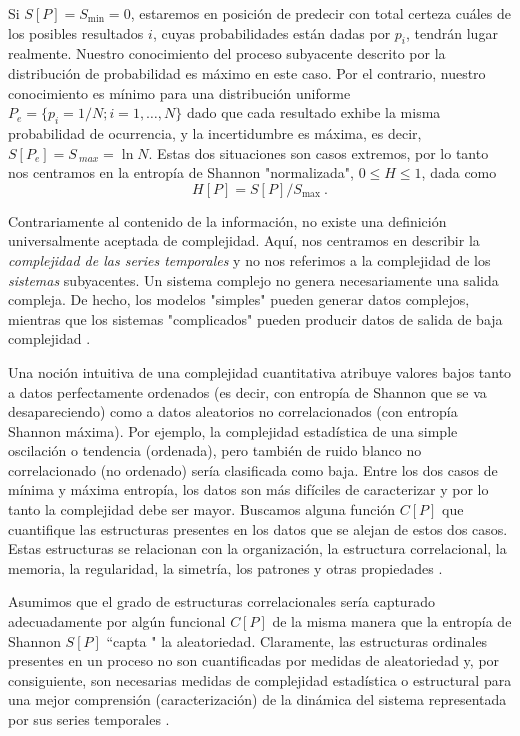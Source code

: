 Si $S[P] = S_{\min} = 0$, estaremos en posición de predecir con total certeza cuáles de los posibles resultados $i$, cuyas probabilidades están dadas por $p_i$, tendrán lugar realmente.
Nuestro conocimiento del proceso subyacente descrito por la distribución de probabilidad es máximo en este caso.
Por el contrario, nuestro conocimiento es mínimo para una distribución uniforme $P_e = \{p_i = 1/N; i = 1, \ldots, N \}$ dado que cada resultado exhibe la misma probabilidad de ocurrencia, y la incertidumbre es máxima, es decir, $S[P_e] = S_{\ max} = \ln N$.
Estas dos situaciones son casos extremos, por lo tanto nos centramos en la entropía de Shannon "normalizada", $0 \leq H \leq 1$, dada como
\begin{equation}
\label{shannon-disc-normalizada}
H[P] = S[P] / S_{\max} \ .
\end{equation}

Contrariamente al contenido de la información, no existe una definición universalmente aceptada de complejidad.
Aquí, nos centramos en describir la \textit{complejidad de las series temporales} y no nos referimos a la complejidad de los \textit{sistemas} subyacentes.
Un sistema complejo no genera necesariamente una salida compleja.
De hecho, los modelos "simples" pueden generar datos complejos, mientras que los sistemas "complicados" pueden producir datos de salida de baja complejidad \cite{Kantz1998}.

Una noción intuitiva de una complejidad cuantitativa atribuye valores bajos tanto a datos perfectamente ordenados (es decir, con entropía de Shannon que se va desapareciendo) como a datos aleatorios no correlacionados (con entropía Shannon máxima).
Por ejemplo, la complejidad estadística de una simple oscilación o tendencia (ordenada), pero también de ruido blanco no correlacionado (no ordenado) sería clasificada como baja.
Entre los dos casos de mínima y máxima entropía, los datos son más difíciles de caracterizar y por lo tanto la complejidad debe ser mayor.
Buscamos alguna función $C[P]$ que cuantifique las estructuras presentes en los datos que se alejan de estos dos casos.
Estas estructuras se relacionan con la organización, la estructura correlacional, la memoria, la regularidad, la simetría, los patrones y otras propiedades \cite{Feldman2008}.

Asumimos que el grado de estructuras correlacionales sería capturado adecuadamente por algún funcional $C[P]$ de la misma manera que la entropía de Shannon $S[P]$ \cite{Shannon1948} ``capta " la aleatoriedad.
Claramente, las estructuras ordinales presentes en un proceso no son cuantificadas por medidas de aleatoriedad y, por consiguiente, son necesarias medidas de complejidad estadística o estructural para una mejor comprensión (caracterización) de la dinámica del sistema representada por sus series temporales \cite{Feldman1998}.

